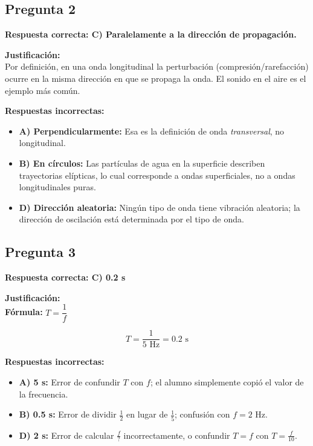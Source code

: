 \begin{respuestabox}
\subsection*{Pregunta 2}
\textcolor{verdecorrecto}{\textbf{Respuesta correcta: C) Paralelamente a la dirección de propagación.}}

\textbf{Justificación:}\\
Por definición, en una onda longitudinal la perturbación (compresión/rarefacción) ocurre en la misma dirección en que se propaga la onda. El sonido en el aire es el ejemplo más común.

\textbf{Respuestas incorrectas:}
\begin{itemize}
    \item \textbf{A) Perpendicularmente:} Esa es la definición de onda \textit{transversal}, no longitudinal.
    \item \textbf{B) En círculos:} Las partículas de agua en la superficie describen trayectorias elípticas, lo cual corresponde a ondas superficiales, no a ondas longitudinales puras.
    \item \textbf{D) Dirección aleatoria:} Ningún tipo de onda tiene vibración aleatoria; la dirección de oscilación está determinada por el tipo de onda.
\end{itemize}
\end{respuestabox}

\begin{respuestabox}
\subsection*{Pregunta 3}
\textcolor{verdecorrecto}{\textbf{Respuesta correcta: C) 0.2 s}}

\textbf{Justificación:}\\
\textbf{Fórmula:} $T = \dfrac{1}{f}$

$$T = \frac{1}{5 \text{ Hz}} = 0.2 \text{ s}$$

\textbf{Respuestas incorrectas:}
\begin{itemize}
    \item \textbf{A) 5 s:} Error de confundir $T$ con $f$; el alumno simplemente copió el valor de la frecuencia.
    \item \textbf{B) 0.5 s:} Error de dividir $\frac{1}{2}$ en lugar de $\frac{1}{5}$; confusión con $f = 2$ Hz.
    \item \textbf{D) 2 s:} Error de calcular $\frac{f}{?}$ incorrectamente, o confundir $T = f$ con $T = \frac{f}{10}$.
\end{itemize}
\end{respuestabox}

